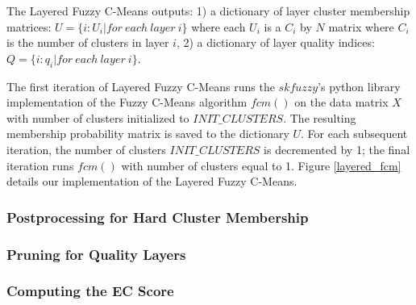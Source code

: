 The Layered Fuzzy C-Means outputs: 1) a dictionary of layer cluster membership matrices:  $U = \{i: U_{i} | for\ each\ layer\ i\}$ where each $U_{i}$ is a $C_{i}$ by $N$ matrix where $C_{i}$ is the number of clusters in layer $i$, 2) a dictionary of layer quality indices: $Q = \{i: q_{i} | for\ each\ layer\ i\}$.

The first iteration of Layered Fuzzy C-Means runs the $skfuzzy$'s python library implementation of the Fuzzy C-Means algorithm $fcm()$ \cite{} on the data matrix $X$ with number of clusters initialized to $INIT\_CLUSTERS$. The resulting membership probability matrix is saved to the dictionary $U$. For each subsequent iteration, the number of clusters $INIT\_CLUSTERS$ is decremented by 1; the final iteration runs $fcm()$ with number of clusters equal to 1. Figure \ref{layered_fcm} details our implementation of the Layered Fuzzy C-Means.

\subsubsection{Postprocessing for Hard Cluster Membership}

\subsubsection{Pruning for Quality Layers}


\subsubsection{Computing the EC Score}

